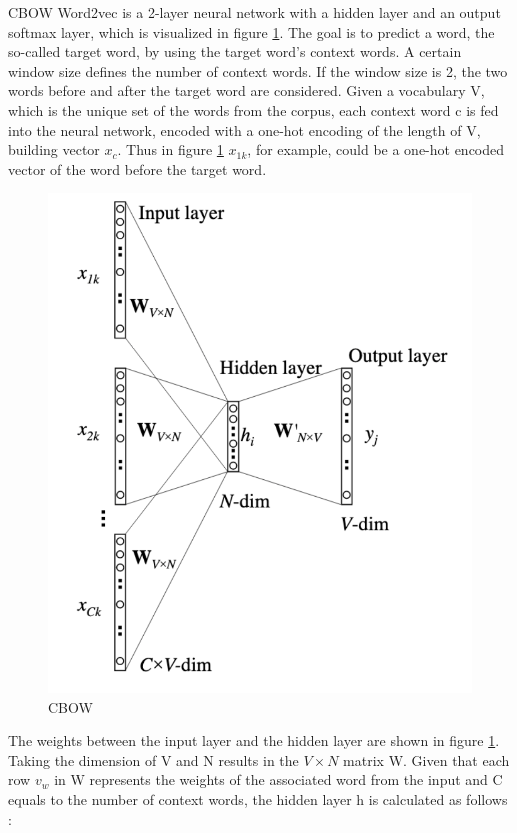 \documentclass[12pt, a4paper, titlepage]{article}
\begin{document}
\ac{CBOW} Word2vec is a 2-layer neural network with a hidden layer and an output softmax layer, which is visualized in figure \ref{fig: F1}. The goal is to predict a word, the so-called target word, by using the target word's context words. A certain window size defines the number of context words. If the window size is 2, the two words before and after the target word are considered. Given a vocabulary V, which is the unique set of the words from the corpus, each context word c is fed into the neural network, encoded with a one-hot encoding of the length of V, building vector $x_c$. Thus in figure \ref*{fig: F1} $x_{1k}$, for example, could be a one-hot encoded vector of the word before the target word. 

\begin{figure}[]
  \center
  \includegraphics[scale=0.5]{word2vecCBOW.png}
  \caption{\label{fig: F1} \ac{CBOW} \citep[6]{rong2014}}
\end{figure}

The weights between the input layer and the hidden layer are shown in figure \ref{fig: F1}. Taking the dimension of V and N results in the $V \times N$ matrix W. Given that each row $v_w$ in W represents the weights of the associated word from the input and C equals to the number of context words, the hidden layer h is calculated as follows \citep{rong2014}:
\end{document}
